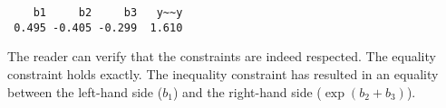\begin{verbatim}
    b1     b2     b3   y~~y 
 0.495 -0.405 -0.299  1.610 
\end{verbatim}

The reader can verify that the constraints are indeed respected. The
equality constraint holds exactly. The inequality constraint has
resulted in an equality between the left-hand side (\(b_1\)) and the
right-hand side (\(\exp(b_2 + b_3)\)).
